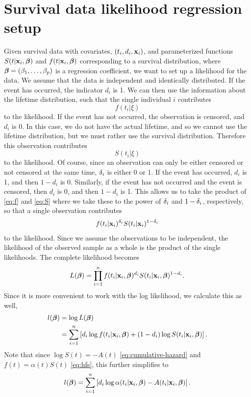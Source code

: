 \section{Survival data likelihood regression setup}
Given survival data with covariates, $(t_i,d_i,\mathbf{x}_i)$, and parameterized functions $S(t|\mathbf{x}_i,\boldsymbol{\beta})$ and $f(t|\mathbf{x}_i,\boldsymbol{\beta})$ corresponding to a survival distribution, where $\boldsymbol{\beta}=(\beta_1,\ldots,\beta_p)$ is a regression coefficient, we want to set up a likelihood for the data. We assume that the data is independent and identically distributed. If the event has occurred, the indicator $d_i$ is 1. We can then use the information about the lifetime distribution, such that the single individual $i$ contributes
\begin{equation}\label{eq:f}
    f(t_i|\xi)
\end{equation}
to the likelihood. If the event has not occurred, the observation is censored, and $d_i$ is 0. In this case, we do not have the actual lifetime, and so we cannot use the lifetime distribution, but we must rather use the survival distribution. Therefore this observation contributes
\begin{equation}\label{eq:S}
    S(t_i|\xi)
\end{equation}
to the likelihood. Of course, since an observation can only be either censored or not censored at the same time, $\delta_{i}$ is either 0 or 1. If the event has occurred, $d_i$ is 1, and then $1-d_i$ is 0. Similarly, if the event has not occurred and the event is censored, then $d_i$
 is 0, and then $1-d_i$ is 1. This allows us to take the product of \eqref{eq:f} and \eqref{eq:S} where we take these to the power of $\delta_{i}$ and $1-\delta_{i}$, respectively, so that a single observation contributes
\begin{equation*}
    f(t_{i}|\mathbf{x}_i)^{\delta_{i}}S(t_{i}|\mathbf{x}_i)^{1-\delta_{i}}
\end{equation*}
to the likelihood. Since we assume the observations to be independent, the likelihood of the observed sample as a whole is the product of the single likelihoods. The complete likelihood becomes
\begin{equation}\label{eq:surv-lik}
    L(\boldsymbol{\beta})=\prod_{i=1}^n f(t_i|\mathbf{x}_i,\boldsymbol{\beta})^{d_i} S(t_i|\mathbf{x}_i,\boldsymbol{\beta})^{1-d_i}.
\end{equation}
Since it is more convenient to work with the log likelihood, we calculate this as well,
\begin{align}\label{eq:surv-lik}
\begin{split}
    l(\boldsymbol{\beta})&=\log L(\boldsymbol{\beta}) \\
    &=\sum_{i=1}^n\left[ d_i \log f(t_i|\mathbf{x}_i,\boldsymbol{\beta}) + (1-d_i)\log S(t_i|\mathbf{x}_i,\boldsymbol{\beta})\right].
\end{split}
\end{align}
Note that since $\log S(t)=-A(t)$ \eqref{eq:cumulative-hazard} and $f(t)=\alpha(t)S(t)$ \eqref{eq:hfs}, this further simplifies to
\begin{equation*}
    l(\boldsymbol{\beta})=\sum_{i=1}^n\left[ d_i \log \alpha(t_i|\mathbf{x}_i,\boldsymbol{\beta}) - A(t_i|\mathbf{x}_i,\boldsymbol{\beta})\right].
\end{equation*}

